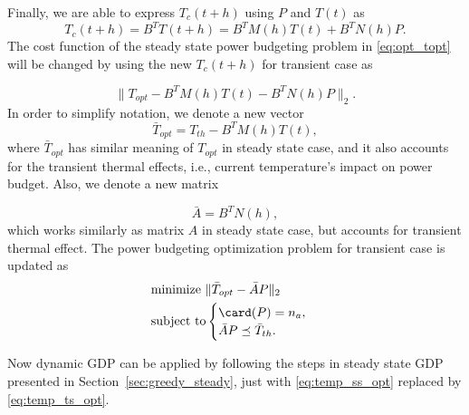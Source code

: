 Finally, we are able to express $T_c(t+h)$ using $P$ and $T(t)$ as
\begin{equation}
T_c(t+h) = B^{T}T(t+h)= B^{T}M(h)T(t)+B^{T}N(h)P.
\end{equation}
The cost function of the steady state power budgeting problem in
\eqref{eq:opt_topt} will be changed by using the new $T_c(t+h)$ for
transient case as

\begin{equation}\label{eq:cost_trans}
\|T_{opt} - B^{T}M(h)T(t) - B^{T}N(h)P \|_2.
\end{equation}
In order to simplify notation, we denote a new vector  
\begin{equation}
\bar{T}_{opt}=T_{th} - B^{T}M(h)T(t),
\end{equation}
where $\bar{T}_{opt}$ has similar meaning of
$T_{opt}$ in steady state case, and it also accounts for the transient
thermal effects, i.e., current temperature's impact on power
budget. Also, we denote a new matrix 

\begin{equation}
\bar{A} = B^{T}N(h), 
\end{equation}
which works similarly as matrix $A$ in steady
state case, but accounts for transient thermal effect. The power
budgeting optimization problem for transient case is updated as 
\begin{equation}\label{eq:temp_ts_opt}
  \begin{split}
    &\text{minimize~} \|\bar{T}_{opt}-\bar{A}P\|_2\\
    &\text{subject to}
    \begin{cases}
      \card(P)=n_a,\\
      \bar{A}P \preceq \bar{T}_{th}.
    \end{cases}
  \end{split}
\end{equation}

Now dynamic GDP can be
applied by following the steps in steady state GDP presented in
Section~\ref{sec:greedy_steady}, just with \eqref{eq:temp_ss_opt} replaced
by \eqref{eq:temp_ts_opt}.